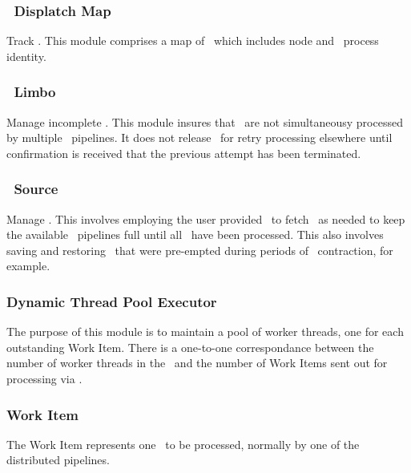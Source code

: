 \begin{itemize}
    \subsubsection{\varCAS~Displatch Map}
    
    Track \varWorkItems.
    This module comprises a map of \varWorkItems~which includes node and \varLinux~process identity.
    
    \subsubsection{\varCAS~Limbo}
    
    Manage incomplete \varWorkItems.
    This module insures that \varWorkItems~are not simultaneousy processed
    by multiple \varUIMA~pipelines.
    It does not release \varWorkItems~for retry processing elsewhere until
    confirmation is received that the previous attempt has been terminated.
    
    \subsubsection{\varCAS~Source}
    
    Manage \varCASes. 
    This involves employing the user provided \varCR~to fetch
    \varCASes~as needed to keep the available \varUIMA~pipelines full
    until all \varCASes~have been processed.
    This also involves saving and restoring \varCASes~that were
    pre-empted during periods of \varJP~contraction, for example.
    
    \subsubsection{Dynamic Thread Pool Executor}
    
    The purpose of this module is to maintain a pool of worker threads,
    one for each outstanding Work Item.
    There is a one-to-one correspondance between the number of worker threads
    in the \varJobDriver~and the number of Work Items sent out for processing
    via \varSendAndReceiveCAS.
    
    \subsubsection{Work Item}
    
    The Work Item represents one \varCAS~to be processed, normally by one of the
    distributed \varUIMA pipelines.
    

\end{itemize}
